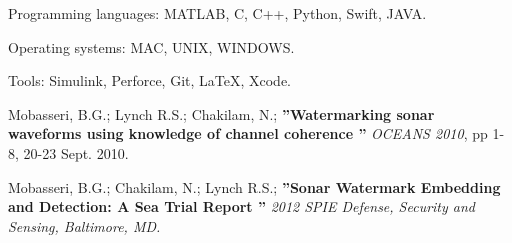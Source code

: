 \documentclass[12pt,a4paper]{article} %
\begin{document}
\inlineheadsection %
{Programming languages:}
{MATLAB, C, C++, Python, Swift, JAVA.}

\inlineheadsection %
{Operating systems:}
{MAC, UNIX, WINDOWS.}

\inlineheadsection %
{Tools:}
{Simulink, Perforce, Git, \LaTeX, Xcode.}



\spacedhrule{1.6em}{-0.4em} %



\inlineheadsection %
{Mobasseri, B.G.; Lynch R.S.; Chakilam, N.;}
{\textbf{''Watermarking sonar waveforms using knowledge of channel coherence ''} \textit{OCEANS 2010}, pp 1-8, 20-23 Sept. 2010.}

\inlineheadsection %
{Mobasseri, B.G.; Chakilam, N.; Lynch R.S.; }
{\textbf{''Sonar Watermark Embedding and Detection: A Sea Trial Report ''} \textit{2012 SPIE Defense, Security and Sensing, Baltimore, MD.}}
\end{document}
